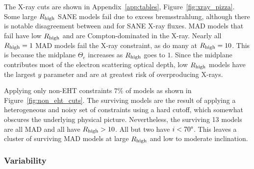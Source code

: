 The X-ray cuts are shown in Appendix~\ref{app:tables},  Figure~\ref{fig:xray_pizza}.  Some large $R_\mathrm{high}$ SANE models fail due to excess bremsstrahlung, although there is notable disagreement between \bhac and \kharma for SANE X-ray fluxes.
MAD models that fail have low $R_\mathrm{high}$ and are Compton-dominated in the X-ray.
Nearly all $R_\mathrm{high} = 1$ MAD models fail the X-ray constraint, as do many at $R_\mathrm{high} = 10$.  This is because the midplane $\Theta_e$ increases as $R_\mathrm{high}$ goes to $1$.
Since the midplane contributes most of the electron scattering optical depth, low $R_\mathrm{high}$ models have the largest $y$ parameter and are at greatest risk of overproducing X-rays.


Applying only non-EHT constraints $7\%$ of models as shown in Figure~\ref{fig:non_eht_cuts}.
The surviving models are the result of applying a heterogeneous and noisy set of constraints using a hard cutoff, which somewhat obscures the underlying physical picture.
Nevertheless, the surviving 13 models are all MAD and all have $R_\mathrm{high} > 10$.  All but two have $i < 70\degree$.
This leaves a cluster of surviving MAD models at large $R_\mathrm{high}$ and low to moderate inclination.

\subsubsection{Variability}

